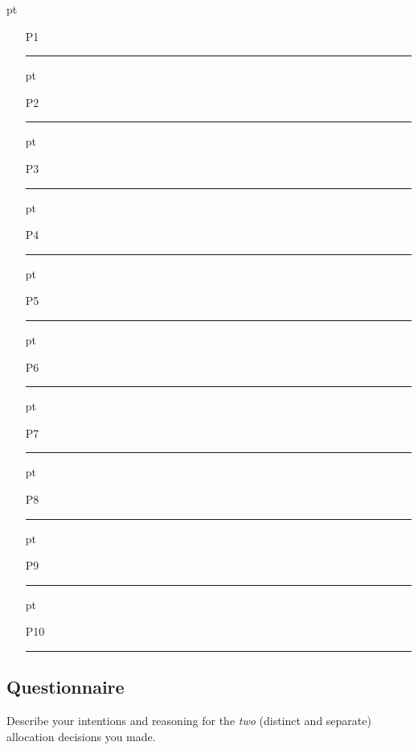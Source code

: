 \documentclass[11pt, oneside]{article}   	%
\begin{document}
 pt
\begin{enumerate}
\setlength\itemsep{20pt}
\item[P1] \rule{6cm}{2pt}
 pt
\item[P2] \rule{6cm}{2pt}
 pt
\item[P3] \rule{6cm}{2pt}
 pt
\item[P4] \rule{6cm}{2pt}
 pt
\item[P5] \rule{6cm}{2pt}
 pt
\item[P6] \rule{6cm}{2pt}
 pt
\item[P7] \rule{6cm}{2pt}
 pt
\item[P8] \rule{6cm}{2pt}
 pt
\item[P9] \rule{6cm}{2pt}
 pt
\item[P10] \rule{6cm}{2pt}
\end{enumerate}


\subsection{Questionnaire}

Describe your intentions and reasoning for the \emph{two} (distinct and separate) allocation decisions you made.
\newpage
\fi



\end{document}
